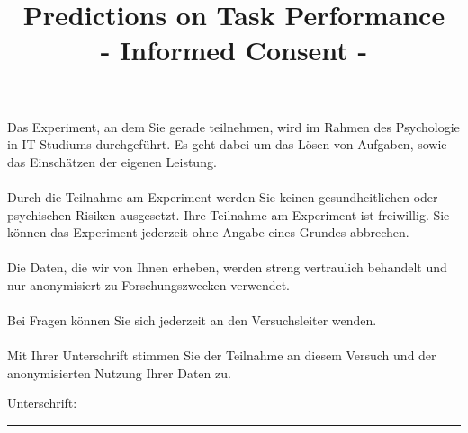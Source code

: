 \documentclass[
ngerman,
accentcolor=9c,%
identbarcolor=9c,
]{tudaexercise}
\title{Predictions on Task Performance\\- Informed Consent -}
\begin{document}
\maketitle



\noindent Das Experiment, an dem Sie gerade teilnehmen, wird im Rahmen des Psychologie in IT-Studiums durchgeführt. Es geht dabei um das Lösen von Aufgaben, sowie das Einschätzen der eigenen Leistung.\\\\
Durch die Teilnahme am Experiment werden Sie keinen gesundheitlichen oder psychischen Risiken ausgesetzt.
Ihre Teilnahme am Experiment ist freiwillig. Sie können das Experiment jederzeit ohne Angabe eines Grundes abbrechen.\\\\
Die Daten, die wir von Ihnen erheben, werden streng vertraulich behandelt und nur anonymisiert zu Forschungszwecken verwendet.\\\\
Bei Fragen können Sie sich jederzeit an den Versuchsleiter wenden.\\\\
Mit Ihrer Unterschrift stimmen Sie der Teilnahme an diesem Versuch und der anonymisierten Nutzung Ihrer Daten zu.

\vspace{0.7cm}

\noindent Unterschrift: \rule{4cm}{1pt}

\vspace{0.7cm}
\end{document}
